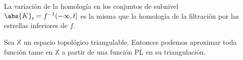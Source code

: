 \begin{property}
\begin{sloppypar}
La variación de la homología en los conjuntos de subnivel ${\abs{K}_t=f^{-1}(-\infty, t]}$ es la misma que la homología de la filtración por las estrellas inferiores de $f$.
\end{sloppypar}
\end{property}

\begin{property}
Sea $\mathbb{X}$ un espacio topológico triangulable. Entonces podemos aproximar toda función tame en $\mathbb{X}$ a partir de una función PL en su triangulación.
\end{property}




